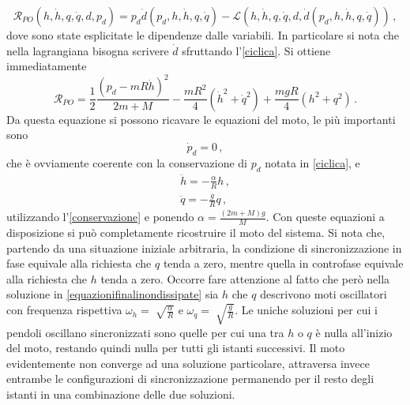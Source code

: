 \documentclass[11pt, a4paper, twoside, italian]{article}
\begin{document}
\begin{equation*}
\mathcal{R}_{PO}(h,\dot h, q, \dot q, d, p_d )  = 
p_d \dot{d}(p_d, h,\dot h, q, \dot q)- \mathcal{L}(h,\dot h, q, \dot q, d, \dot{d}(p_d, h,\dot h, q, \dot q)) \, ,
\end{equation*}
dove sono state esplicitate le dipendenze dalle variabili. 
In particolare si nota che nella lagrangiana bisogna scrivere $\dot d$ sfruttando l'\cref{ciclica}.
Si ottiene immediatamente 
\begin{equation*}
  \mathcal{R}_{PO} = \frac{1}{2} \frac{(p_d -mR\dot h)^2}{2m + M}- \frac{mR^2}{4}  (\dot{h}^2 + \dot{q}^2) + \frac{mgR}{4}(h^2 + q^2) \, .
\end{equation*}
Da questa equazione si possono ricavare le equazioni del moto, le più importanti sono 
\begin{equation}
  \dot p_d = 0 \, ,
  \label{conservazione}
\end{equation}
che è ovviamente coerente con la conservazione di $p_d$ notata in \cref{ciclica}, e
\begin{equation}
  \begin{split}
  \ddot h = -\frac{\alpha}{R} h \, ,\\
  \ddot q = - \frac{g}{R} q \, ,
  \end{split}
  \label{equazionifinalinondissipate}
\end{equation}
utilizzando l'\cref{conservazione} e ponendo $\alpha = \frac{(2m + M) g}{M} $.
Con queste equazioni a disposizione si può completamente ricostruire il moto del sistema.
Si nota che, partendo da una situazione iniziale arbitraria,
la condizione di sincronizzazione in fase equivale alla richiesta che $q$ tenda a zero, mentre quella in controfase
equivale alla richiesta che $h$ tenda a zero. 
Occorre fare attenzione al fatto che però nella soluzione in \cref{equazionifinalinondissipate} sia $h$ che $q$ descrivono moti oscillatori con frequenza rispettiva
$\omega_h = \sqrt[]{\frac{\alpha}{R}}$ e $\omega_q = \sqrt[]{\frac{g}{R}}$.
Le uniche soluzioni per cui i pendoli oscillano sincronizzati sono quelle per cui una tra $h$ o $q$ è nulla
all'inizio del moto, restando quindi nulla per tutti gli istanti successivi.
Il moto evidentemente non converge ad una soluzione particolare, attraversa invece entrambe le configurazioni di sincronizzazione 
permanendo per il resto degli istanti in una combinazione delle due soluzioni.
\label{sezionesenzaattrito}
\end{document}
